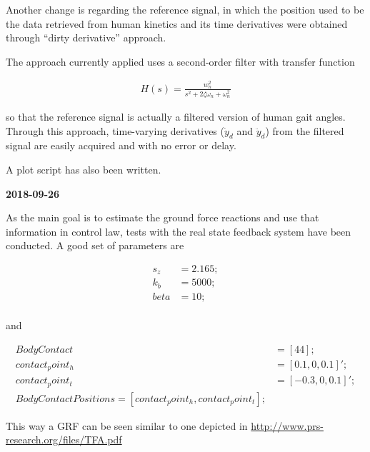 Another change is regarding the reference signal, in which the position used to be the data retrieved from human kinetics and its time derivatives were obtained through ``dirty derivative'' approach.

The approach currently applied uses a second-order filter with transfer function

\begin{align}
	H(s) = \frac{w_{n}^2}{s^2 + 2\zeta \omega_n + \omega_n^2}
\end{align}

so that the reference signal is actually a filtered version of human gait angles. Through this approach, time-varying derivatives ($\dot{y}_d$ and $\ddot{y}_d$) from the filtered signal are easily acquired and with no error or delay.

A plot script has also been written.

\textbf{2018-09-26}

As the main goal is to estimate the ground force reactions and use that information in control law, tests with the real state feedback system have been conducted. A good set of parameters are 

\begin{align}
s_z &= 2.165 ; \\%
k_b &= 5000; \\%
beta &= 10; \\%
\end{align}

and 

\begin{align}
BodyContact &= [ 4 4 ]; \\%
contact_point_h &= [  0.1, 0, 0.1 ]'; \\%
contact_point_t &= [ -0.3, 0, 0.1 ]'; \\%
BodyContactPositions = [ contact_point_h, contact_point_t ];
\end{align}

This way a GRF can be seen similar to one depicted in \url{http://www.prs-research.org/files/TFA.pdf}

